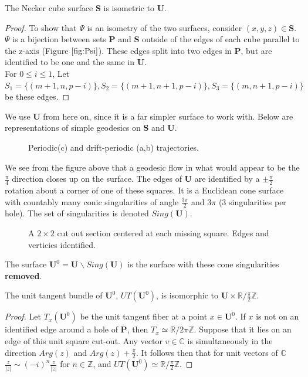 \documentclass[]{article}
\begin{document}
\begin{thm}
The Necker cube surface $\mathbf{S}$ is isometric to $\mathbf{U}$.
\begin{proof}
To show that $\Psi$ is an isometry of the two surfaces, consider $(x,y,z)\in\mathbf{S}$. $\Psi$ is a bijection between sets $\mathbf{P}$ and $\mathbf{S}$ outside of the edges of each cube parallel to the z-axis (Figure $\ref{fig:Psi}$). These edges split into two edges in $\mathbf{P}$, but are identified to be one and the same in $\mathbf{U}$.\\
For $0\leq i\leq 1$, Let $S_1=\{(m+1,n,p-i)\}, S_2=\{(m+1,n+1,p-i)\}, S_3=\{(m,n+1,p-i)\}$ be these edges.
\end{proof}
\end{thm}

\noindent We use $\mathbf{U}$ from here on, since it is a far simpler surface to work with. Below are representations of simple geodesics on $\mathbf{S}$ and $\mathbf{U}$.

\begin{figure}[H]
\centering


\caption{Periodic(c) and drift-periodic (a,b) trajectories.}
\end{figure}

We see from the figure above that a geodesic flow in what would appear to be the $\frac{\pi}{4}$ direction closes up on the surface. The edges of $\mathbf{U}$ are identified by a $\pm\frac{\pi}{2}$ rotation about a corner of one of these squares. It is a Euclidean cone surface with countably many conic singularities of angle $\frac{3\pi}{2}$ and $3\pi$ (3 singularities per hole). The set of singularities is denoted $Sing(\mathbf{U})$.

\begin{figure}[H]
\centering

\caption{A $2\times2$ cut out section centered at each missing square. Edges and verticies identified.}
\label{fig:quotient}
\end{figure}

The surface $\mathbf{U}^0=\mathbf{U}\backslash Sing(\mathbf{U})$ is the surface with these cone singularities \textbf{removed}.

\begin{lem}
The unit tangent bundle of $\mathbf{U}^0$, $UT(\mathbf{U}^0)$, is isomorphic to $\mathbf{U} \times\mathbb{R}/\frac{\pi}{2}\mathbb{Z}$.
\begin{proof}
Let $T_x(\mathbf{U}^0)$ be the unit tangent fiber at a point $x\in\mathbf{U}^0$. If $x$ is not on an identified edge around a hole of $\mathbf{P}$, then $T_x\simeq\mathbb{R}/2\pi\mathbb{Z}$. Suppose that it lies on an edge of this unit square cut-out. Any vector $v\in\mathbb{C}$ is simultaneously in the direction $Arg(z)$ and $Arg(z)+\frac{\pi}{2}$. It follows then that for unit vectors of $\mathbb{C}$ $\frac{z}{|z|}\sim(-i)^n\frac{z}{|z|}$ for $n\in\mathbb{Z}$, and $UT(\mathbf{U}^0)\simeq\mathbb{R}/\frac{\pi}{2}\mathbb{Z}$.
\end{proof}
\end{lem}
\end{document}
